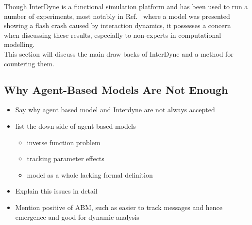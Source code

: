 \documentclass{article}
\begin{document}
Though InterDyne is a functional simulation platform and has been used to run a number of experiments, most notably in Ref.~\cite{DynamicCoupling_Chris} where a model was presented showing a flash crash caused by interaction dynamics, it possesses a concern when discussing these results, especially to non-experts in computational modelling.\\
This section will discuss the main draw backs of InterDyne and a method for countering them.  



\subsection{Why Agent-Based Models Are Not Enough} \label{Iinterdynenotenough}

\begin{itemize}
  \item Say why agent based model and Interdyne are not always accepted
  \item list the down side of agent based models \begin{itemize}
  \item inverse function problem
  \item tracking parameter effects
  \item model as a whole lacking formal definition 
\end{itemize}
  \item Explain this issues in detail 
  \item Mention positive of ABM, such as easier to track messages and hence emergence and good for dynamic analysis 
\end{itemize}
\end{document}
